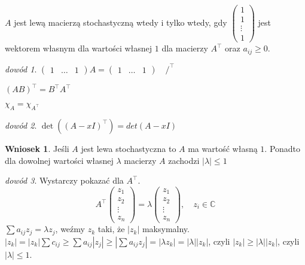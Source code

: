 \documentclass[10pt]{article}
\theoremstyle{definition}
\theoremstyle{definition}
\theoremstyle{definition}
\theoremstyle{definition}
\theoremstyle{remark}
\newtheorem*{dd}{dowód}
\theoremstyle{definition}
\theoremstyle{definition}
\newtheorem*{wn}{Wniosek}
\theoremstyle{definition}
\theoremstyle{definition}
\theoremstyle{definition}
\begin{document}
\begin{ft} 
    $A$ jest lewą macierzą stochastyczną wtedy i tylko wtedy, gdy 
    $\begin{pmatrix} 1 \\ 1 \\ \vdots \\ 1 \end{pmatrix}$
    jest wektorem własnym dla wartości własnej $1$ dla macierzy $A^\top$ oraz $a_{ij} \ge 0$.
\end{ft} 
\begin{dd} 
    $\begin{pmatrix} 1 & \ldots & 1 \end{pmatrix} A = \begin{pmatrix} 1 & \ldots & 1 \end{pmatrix} \quad /^\top$
\end{dd} 
\begin{ft} $(AB)^\top = B^\top A^\top$ \end{ft} 
\begin{ft} $\chi_A = \chi_{A^\top}$ \end{ft} 
\begin{dd} $\det ((A-xI)^\top) = det(A-xI)$ \end{dd} 
\begin{wn} Jeśli $A$ jest lewa stochastyczna to $A$ ma wartość własną $1$. Ponadto dla dowolnej wartości własnej 
    $\lambda$ macierzy $A$ zachodzi $|\lambda| \le 1$ \end{wn}
\begin{dd} 
    Wystarczy pokazać dla $A^\top$. 
    \[ A^\top \begin{pmatrix} z_1 \\ z_2 \\ \vdots \\ z_n \end{pmatrix} = 
    \lambda \begin{pmatrix} z_1 \\ z_2 \\ \vdots \\ z_n \end{pmatrix}, \quad z_i \in \mathbb C\]
    $ \sum a_{ij} z_j = \lambda z_j $, weźmy $z_k$ taki, że $|z_k|$ maksymalny. \\ 
    $|z_k| = |z_k| \sum c_{ij} \ge \sum a_{ij} |z_j| \ge | \sum a_{ij} z_j| = |\lambda z_k| = |\lambda| |z_k|$, 
    czyli $|z_k| \ge |\lambda| |z_k|$, czyli $|\lambda| \le 1$.
\end{dd} 
\end{document}
